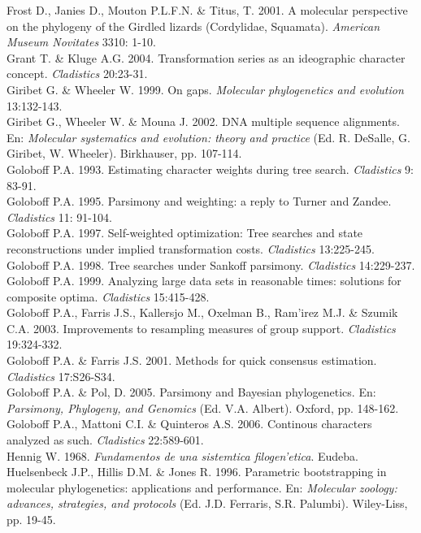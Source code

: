 Frost D., Janies D., Mouton P.L.F.N. \& Titus, T. 2001. A molecular perspective on the phylogeny of the Girdled lizards (Cordylidae, Squamata). \textit{American Museum Novitates} 3310: 1-10.\\
Grant T. \& Kluge A.G. 2004. Transformation series as an ideographic character concept. \textit{Cladistics} 20:23-31.\\
Giribet G. \& Wheeler W. 1999. On gaps. \textit{Molecular phylogenetics and evolution} 13:132-143.\\
Giribet G., Wheeler W. \& Mouna J. 2002. DNA multiple sequence alignments. En: \textit{Molecular systematics and evolution: theory and practice} (Ed. R. DeSalle, G. Giribet, W. Wheeler). Birkhauser, pp. 107-114.\\ 
Goloboff P.A. 1993. Estimating character weights during tree search. \textit{Cladistics} 9: 83-91.\\
Goloboff P.A. 1995. Parsimony and weighting: a reply to Turner and Zandee. \textit{Cladistics} 11: 91-104.\\
Goloboff P.A. 1997. Self-weighted optimization: Tree searches and state reconstructions under implied transformation costs. \textit{Cladistics} 13:225-245.\\
Goloboff P.A. 1998. Tree searches under Sankoff parsimony. \textit{Cladistics} 14:229-237.\\
Goloboff P.A. 1999. Analyzing large data sets in reasonable times: solutions for composite optima. \textit{Cladistics} 15:415-428.\\
Goloboff P.A., Farris J.S., Kallersjo M., Oxelman B., Ram'irez M.J. \& Szumik C.A. 2003. Improvements to resampling measures of group support. \textit{Cladistics} 19:324-332.\\
Goloboff P.A. \& Farris J.S. 2001. Methods for quick consensus estimation. \textit{Cladistics} 17:S26-S34.\\
Goloboff P.A. \& Pol, D. 2005. Parsimony and Bayesian phylogenetics. En: \textit{Parsimony, Phylogeny, and Genomics} (Ed. V.A. Albert). Oxford, pp. 148-162.\\
Goloboff P.A., Mattoni C.I. \& Quinteros A.S. 2006. Continous characters analyzed as such. \textit{Cladistics} 22:589-601.\\
Hennig W. 1968. \textit{Fundamentos de una sistemtica filogen'etica}. Eudeba.\\
Huelsenbeck J.P., Hillis D.M. \& Jones R. 1996. Parametric bootstrapping in molecular phylogenetics: applications and performance. En: \textit{Molecular zoology: advances, strategies, and protocols} (Ed. J.D. Ferraris, S.R. Palumbi). Wiley-Liss, pp. 19-45.\\  

